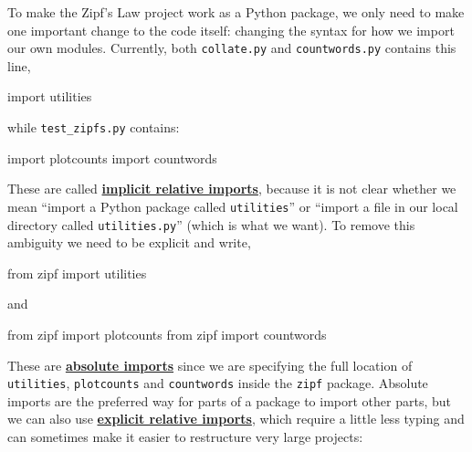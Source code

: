 \documentclass[
]{krantz}
\makeatletter
\newenvironment{Shaded}{\begin{snugshade}}{\end{snugshade}}
\newcommand{\ImportTok}[1]{#1}
\newcommand{\NormalTok}[1]{#1}
\newenvironment{kframe}{%
\medskip{}
\setlength{\fboxsep}{.8em}
 \def\at@end@of@kframe{}%
 \ifinner\ifhmode%
  \def\at@end@of@kframe{\end{minipage}}%
  \begin{minipage}{\columnwidth}%
 \fi\fi%
 \def\FrameCommand##1{\hskip\@totalleftmargin \hskip-\fboxsep
 \colorbox{shadecolor}{##1}\hskip-\fboxsep
     \hskip-\linewidth \hskip-\@totalleftmargin \hskip\columnwidth}%
 \MakeFramed {\advance\hsize-\width
   \@totalleftmargin\z@ \linewidth\hsize
   \@setminipage}}%
 {\par\unskip\endMakeFramed%
 \at@end@of@kframe}
\renewenvironment{Shaded}{\begin{kframe}}{\end{kframe}}
\newcommand{\gref}[2]{\hyperlink{#2}{\textbf{#1}}}
\makeatother
\begin{document}
To make the Zipf's Law project work as a Python package,
we only need to make one important change to the code itself:
changing the syntax for how we import our own modules.
Currently,
both \texttt{collate.py} and \texttt{countwords.py} contains this line,

\begin{Shaded}
\begin{Highlighting}[]
\ImportTok{import}\NormalTok{ utilities}
\end{Highlighting}
\end{Shaded}

while \texttt{test\_zipfs.py} contains:

\begin{Shaded}
\begin{Highlighting}[]
\ImportTok{import}\NormalTok{ plotcounts}
\ImportTok{import}\NormalTok{ countwords}
\end{Highlighting}
\end{Shaded}

These are called
\gref{implicit relative imports}{implicit\_relative\_import},
because it is not clear whether we mean
``import a Python package called \texttt{utilities}''
or
``import a file in our local directory called \texttt{utilities.py}''
(which is what we want).
To remove this ambiguity we need to be explicit and write,

\begin{Shaded}
\begin{Highlighting}[]
\ImportTok{from}\NormalTok{ zipf }\ImportTok{import}\NormalTok{ utilities}
\end{Highlighting}
\end{Shaded}

and

\begin{Shaded}
\begin{Highlighting}[]
\ImportTok{from}\NormalTok{ zipf }\ImportTok{import}\NormalTok{ plotcounts}
\ImportTok{from}\NormalTok{ zipf }\ImportTok{import}\NormalTok{ countwords}
\end{Highlighting}
\end{Shaded}

These are \gref{absolute imports}{absolute\_import}
since we are specifying the full location of \texttt{utilities}, \texttt{plotcounts} and \texttt{countwords}
inside the \texttt{zipf} package.
Absolute imports are the preferred way for parts of a package to import other parts,
but we can also use
\gref{explicit relative imports}{explicit\_relative\_import},
which require a little less typing
and can sometimes make it easier to restructure very large projects:
\end{document}
